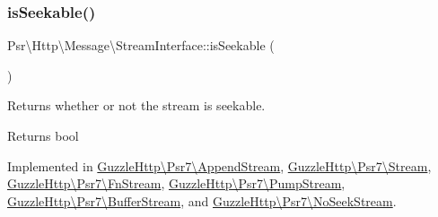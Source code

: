 \mbox{\label{interfacePsr_1_1Http_1_1Message_1_1StreamInterface_ad4a27548fd51bd12390d798981a1622b}} 
\subsubsection{\texorpdfstring{is\+Seekable()}{isSeekable()}}
{\footnotesize\ttfamily Psr\textbackslash{}\+Http\textbackslash{}\+Message\textbackslash{}\+Stream\+Interface\+::is\+Seekable (\begin{DoxyParamCaption}{ }\end{DoxyParamCaption})}

Returns whether or not the stream is seekable.

\begin{DoxyReturn}{Returns}
bool 
\end{DoxyReturn}


Implemented in \hyperlink{classGuzzleHttp_1_1Psr7_1_1AppendStream_abca8060e94e6c266fb987ae52c9119a2}{Guzzle\+Http\textbackslash{}\+Psr7\textbackslash{}\+Append\+Stream}, \hyperlink{classGuzzleHttp_1_1Psr7_1_1Stream_a9c550016f44e763b6acc5b6be865b3f6}{Guzzle\+Http\textbackslash{}\+Psr7\textbackslash{}\+Stream}, \hyperlink{classGuzzleHttp_1_1Psr7_1_1FnStream_a6e71bee66417963b7dbab145c209da6c}{Guzzle\+Http\textbackslash{}\+Psr7\textbackslash{}\+Fn\+Stream}, \hyperlink{classGuzzleHttp_1_1Psr7_1_1PumpStream_adb38791f41a513a01be857ad59eca8e7}{Guzzle\+Http\textbackslash{}\+Psr7\textbackslash{}\+Pump\+Stream}, \hyperlink{classGuzzleHttp_1_1Psr7_1_1BufferStream_a0ce11381069f05f76393a5f032b432f7}{Guzzle\+Http\textbackslash{}\+Psr7\textbackslash{}\+Buffer\+Stream}, and \hyperlink{classGuzzleHttp_1_1Psr7_1_1NoSeekStream_abf8fbb7645ade4f77b498208e31be38e}{Guzzle\+Http\textbackslash{}\+Psr7\textbackslash{}\+No\+Seek\+Stream}.

\mbox{\label{interfacePsr_1_1Http_1_1Message_1_1StreamInterface_a79287940d75d1951b831879fdc493883}} 
